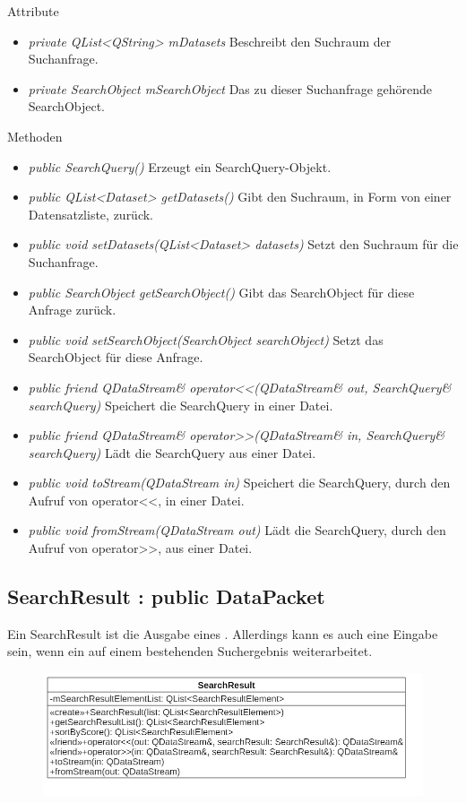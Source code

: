 Attribute
\begin{itemize}
\item\textit{private QList<QString> mDatasets} Beschreibt den Suchraum der Suchanfrage.
\item\textit{private SearchObject mSearchObject} Das zu dieser Suchanfrage gehörende SearchObject.
\end{itemize}

Methoden
\begin{itemize}
\item \textit{public SearchQuery()} Erzeugt ein SearchQuery-Objekt.
\item \textit{public QList<Dataset> getDatasets()} Gibt den Suchraum, in Form von einer Datensatzliste, zurück.
\item \textit{public void setDatasets(QList<Dataset> datasets)} Setzt den Suchraum für die Suchanfrage.
\item \textit{public SearchObject getSearchObject()} Gibt das SearchObject für diese Anfrage zurück.
\item \textit{public void setSearchObject(SearchObject searchObject)} Setzt das SearchObject für diese Anfrage.
\item \textit{public friend QDataStream\& operator<<(QDataStream\& out, SearchQuery\& searchQuery)} Speichert die SearchQuery in einer Datei.
\item \textit{public friend QDataStream\& operator>>(QDataStream\& in, SearchQuery\& searchQuery)} Lädt die SearchQuery aus einer Datei.
\item \textit{public void toStream(QDataStream in)} Speichert die SearchQuery, durch den Aufruf von operator<<, in einer Datei.
\item \textit{public void fromStream(QDataStream out)} Lädt die SearchQuery, durch den Aufruf von operator>>, aus einer Datei.
\end{itemize}

\subsection*{SearchResult : public DataPacket}
Ein SearchResult ist die Ausgabe eines . Allerdings kann es auch eine Eingabe sein, wenn ein  auf einem bestehenden Suchergebnis weiterarbeitet.

\begin{figure}[H]
\centering
\includegraphics[scale=0.5]{img/Klassendiagramm/Klassen/Model/SearchResult}
\label{fig:searchResult}
\end{figure}

